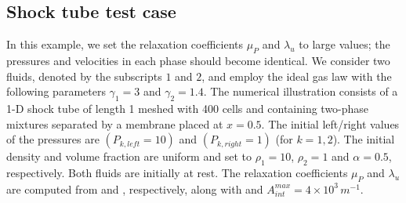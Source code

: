 \subsection{Shock tube test case}\label{sec:first-test}
%
In this example, we set the relaxation coefficients $\mu_P$ and $\lambda_u$ to large values; the pressures and velocities in each phase should become identical. 
We consider two fluids, denoted by the subscripts $1$ and $2$, and employ the ideal gas law with the following parameters $\gamma_1=3$ and $\gamma_2=1.4$. 
The numerical illustration consists of a 1-D shock tube of length 1 meshed with 400 cells and containing two-phase mixtures separated by a membrane placed at $x=0.5$. 
The initial left/right values of the pressures are
 $(P_{k,left}=10)$ and $(P_{k,right}=1)$ (for $k=1,2$). The initial density and volume fraction are uniform and set to $\rho_1=10$, $\rho_2=1$ and $\alpha = 0.5$, respectively. 
Both fluids are initially at rest. The relaxation coefficients $\mu_P$ and $\lambda_u$ are computed from  and , respectively, 
along with  and $A_{int}^{max}=4 \times 10^3\,m^{-1}$.
 
